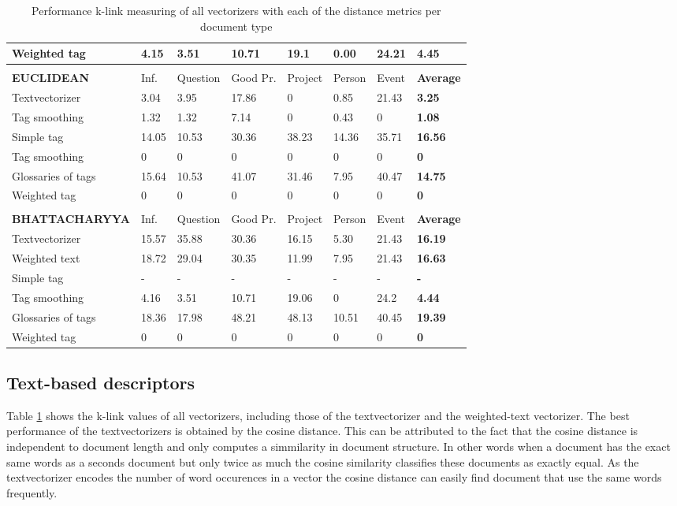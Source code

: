 \begin{table}
\begin{tabular}{| l | l | l | l | l | l | l | l |}
Weighted tag & 4.15 & 3.51 & 10.71 & 19.1 & 0.00 & 24.21 & {\bf 4.45} \\ 
\hline
\\
\hline
{\bf EUCLIDEAN} & Inf. &  Question &  Good Pr.& Project & Person &  Event & {\bf Average} \\
\hline
Textvectorizer & 3.04 & 3.95 & 17.86 & 0 & 0.85 & 21.43 & {\bf 3.25} \\ 
Tag smoothing & 1.32 & 1.32 & 7.14 & 0 & 0.43 & 0 & {\bf 1.08} \\ 
Simple tag & 14.05 & 10.53  & 30.36 & 38.23 & 14.36 & 35.71 & {\bf 16.56} \\ 
Tag smoothing & 0 & 0 & 0 & 0 & 0 & 0 & {\bf 0} \\ 
Glossaries of tags & 15.64 & 10.53 & 41.07 & 31.46 & 7.95 & 40.47 & {\bf 14.75} \\ 
Weighted tag & 0 & 0 & 0 & 0 & 0 & 0 & {\bf 0} \\ 
\hline
\\
\hline
{\bf BHATTACHARYYA} & Inf. &  Question &  Good Pr.& Project & Person &  Event & {\bf Average} \\
\hline
Textvectorizer & 15.57 & 35.88 & 30.36 & 16.15 & 5.30 & 21.43 & {\bf 16.19} \\ 
Weighted text & 18.72 & 29.04 & 30.35 & 11.99 & 7.95 & 21.43 & {\bf 16.63} \\ 
Simple tag & - & - & - & - & - & - & {\bf -} \\ 
Tag smoothing & 4.16 & 3.51 & 10.71 & 19.06 & 0 & 24.2 & {\bf 4.44} \\ 
Glossaries of tags & 18.36 & 17.98 & 48.21 & 48.13 & 10.51 & 40.45 & {\bf 19.39} \\ 
Weighted tag & 0 & 0 & 0 & 0 & 0 & 0 & {\bf 0} \\ 
\hline
\end{tabular}

\caption{Performance k-link measuring of all vectorizers with each of the distance metrics per document type}
\label{klink}
\end{table}

\subsection{Text-based descriptors}
Table \ref{klink} shows the k-link values of all vectorizers, including those of the textvectorizer and the weighted-text vectorizer. The best performance of the textvectorizers is obtained by the cosine distance. This can be attributed
 to the fact that the cosine distance is independent to document length and only
 computes a simmilarity in document structure. In other words when a document
 has the exact same words as a seconds document but only twice as much the
 cosine similarity classifies these documents as exactly equal. As the textvectorizer
 encodes the number of word occurences in a vector the cosine distance can 
 easily find document that use the same words frequently.

